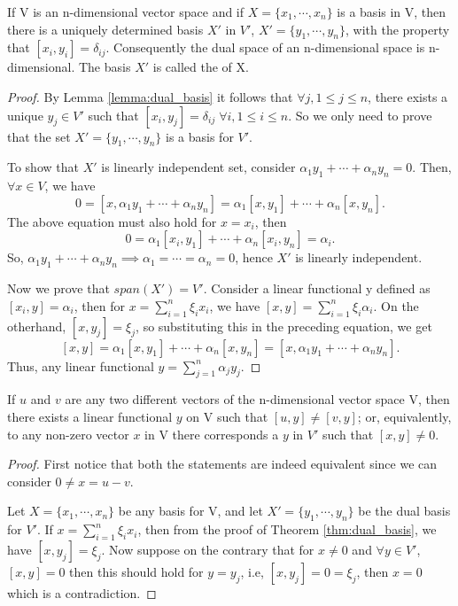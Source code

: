 \documentclass[11pt,a4paper]{article}
\begin{document}
\begin{theorem}\label{thm:dual_basis}
    If V is an n-dimensional vector space and if $X = \{x_1,\cdots,x_n\}$ is a basis in V, then there is a uniquely determined basis $X'$ in $V'$, $X' = \{y_1, \cdots, y_n\}$, with the property that $[x_i, y_i] = \delta_{ij}$. Consequently the dual space of an n-dimensional space is n-dimensional. The basis $X'$ is called the  of X.
\end{theorem}

\begin{proof}
    By Lemma \ref{lemma:dual_basis} it follows that $\forall j,1\le j\le n$, there exists a unique $y_j\in V'$ such that $[x_i,y_j]=\delta_{ij}\;\forall i,1\le i\le n$. So we only need to prove that the set $X' = \{y_1, \cdots, y_n\}$ is a basis for $V'$.

    To show that $X'$ is linearly independent set, consider $\alpha_1y_1+\cdots+\alpha_ny_n=0$. Then, $\forall x\in V$, we have
    $$
        0 = [x,\alpha_1y_1+\cdots+\alpha_ny_n] = \alpha_1[x,y_1]+\cdots+\alpha_n[x,y_n].
    $$
    The above equation must also hold for $x = x_i$, then 
    $$
        0 = \alpha_1[x_i,y_1]+\cdots+\alpha_n[x_i,y_n] = \alpha_i.
    $$
    So, $\alpha_1y_1+\cdots+\alpha_ny_n\implies \alpha_1 = \cdots = \alpha_n = 0$, hence $X'$ is linearly independent.

    Now we prove that $span(X')=V'$. Consider a linear functional y defined as $[x_i,y]=\alpha_i$, then for $x=\sum_{i=1}^n\xi_ix_i$, we have $[x,y]=\sum_{i=1}^n\xi_i\alpha_i$. On the otherhand, $[x,y_j] = \xi_j$, so substituting this in the preceding equation, we get 
    $$
        [x,y] = \alpha_1[x,y_1]+\cdots+\alpha_n[x,y_n] = [x,\alpha_1y_1+\cdots+\alpha_ny_n].
    $$
    Thus, any linear functional $y = \sum_{j=1}^n\alpha_jy_j$.
\end{proof}

\begin{corollary}\label{cor:dual_basis}
    If $u$ and $v$ are any two different vectors of the n-dimensional vector space V, then there exists a linear functional $y$ on V such that $[u, y] \neq [v, y]$; or, equivalently, to any non-zero vector $x$ in V there corresponds a $y$ in $V'$ such that $[x, y] \neq 0$.
\end{corollary}

\begin{proof}
    First notice that both the statements are indeed equivalent since we can consider $0\neq x = u-v$.

    Let $X = \{x_1,\cdots,x_n\}$ be any basis for V, and let $X'=\{y_1,\cdots,y_n\}$ be the dual basis for $V'$. If $x=\sum_{i=1}^n\xi_ix_i$, then from the proof of Theorem \ref{thm:dual_basis}, we have $[x,y_j] = \xi_j$. 
    Now suppose on the contrary that for $x\neq 0$ and $\forall y\in V'$, $[x,y]=0$ then this should hold for $y=y_j$, i.e, $[x,y_j]=0=\xi_j$, then $x=0$ which is a contradiction.
\end{proof}
\end{document}
